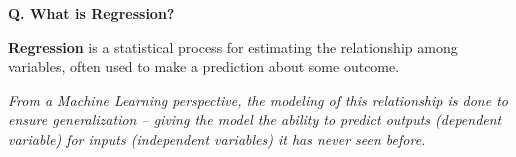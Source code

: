 \begin{frame}[fragile]{\textbf{Q. What is Regression?}}
  \begin{wideitemize}
  \item \textbf{Regression} is a statistical process for estimating
  the relationship among variables, often used to make a prediction about
  some outcome.\medskip
  \begin{wideitemize} 
    \item \textit{From a Machine Learning perspective, the modeling of this relationship
    is done to ensure generalization -- giving the model the ability to predict
    outputs (dependent variable) for inputs (independent variables) it has never
    seen before.}
  \end{wideitemize}
  \end{wideitemize}
\end{frame}


